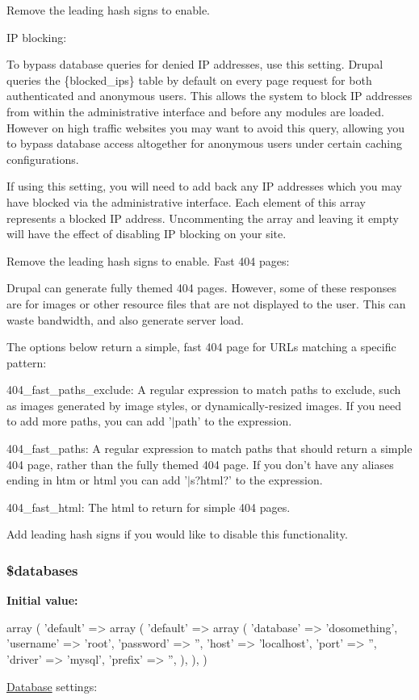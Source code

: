 Remove the leading hash signs to enable.

IP blocking:

To bypass database queries for denied IP addresses, use this setting. Drupal queries the \{blocked\_\-ips\} table by default on every page request for both authenticated and anonymous users. This allows the system to block IP addresses from within the administrative interface and before any modules are loaded. However on high traffic websites you may want to avoid this query, allowing you to bypass database access altogether for anonymous users under certain caching configurations.

If using this setting, you will need to add back any IP addresses which you may have blocked via the administrative interface. Each element of this array represents a blocked IP address. Uncommenting the array and leaving it empty will have the effect of disabling IP blocking on your site.

Remove the leading hash signs to enable. Fast 404 pages:

Drupal can generate fully themed 404 pages. However, some of these responses are for images or other resource files that are not displayed to the user. This can waste bandwidth, and also generate server load.

The options below return a simple, fast 404 page for URLs matching a specific pattern:
\begin{DoxyItemize}
\item 404\_\-fast\_\-paths\_\-exclude: A regular expression to match paths to exclude, such as images generated by image styles, or dynamically-\/resized images. If you need to add more paths, you can add '$|$path' to the expression.
\item 404\_\-fast\_\-paths: A regular expression to match paths that should return a simple 404 page, rather than the fully themed 404 page. If you don't have any aliases ending in htm or html you can add '$|$s?html?' to the expression.
\item 404\_\-fast\_\-html: The html to return for simple 404 pages.
\end{DoxyItemize}

Add leading hash signs if you would like to disable this functionality. \hypertarget{settings_8php_a97cde67402a68697692531e8b067f86f}{
\subsubsection[{\$databases}]{\setlength{\rightskip}{0pt plus 5cm}\$databases}}
\label{settings_8php_a97cde67402a68697692531e8b067f86f}
{\bfseries Initial value:}
\begin{DoxyCode}
 array (
  'default' => 
  array (
    'default' => 
    array (
      'database' => 'dosomething',
      'username' => 'root',
      'password' => '',
      'host' => 'localhost',
      'port' => '',
      'driver' => 'mysql',
      'prefix' => '',
    ),
  ),
)
\end{DoxyCode}
\hyperlink{classDatabase}{Database} settings:

